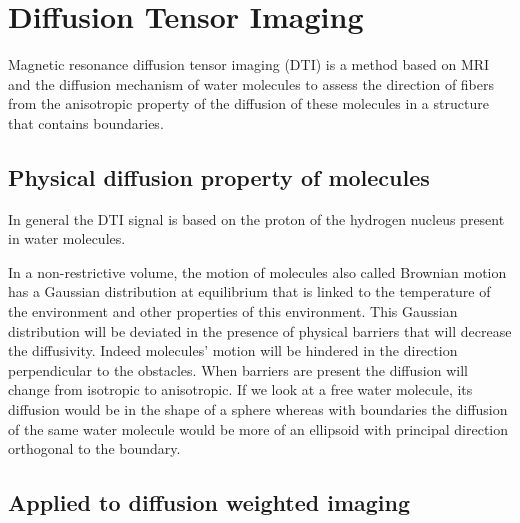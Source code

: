 \section{Diffusion Tensor Imaging}

Magnetic resonance diffusion tensor imaging (DTI) is a method based on MRI and the diffusion mechanism of water molecules to assess the direction of fibers from the anisotropic property of the diffusion of these molecules in a structure that contains boundaries.

\subsection{Physical diffusion property of molecules}

In general the DTI signal is based on the proton of the hydrogen nucleus present in water molecules.

In a non-restrictive volume, the motion of molecules also called Brownian motion has a Gaussian distribution at equilibrium that is linked to the temperature of the environment and other properties of this environment. This Gaussian distribution will be deviated in the presence of physical barriers that will decrease the diffusivity. Indeed molecules' motion will be hindered in the direction perpendicular to the obstacles. When barriers are present the diffusion will change from isotropic to anisotropic. If we look at a free water molecule, its diffusion would be in the shape of a sphere whereas with boundaries the diffusion of the same water molecule would be more of an ellipsoid with principal direction orthogonal to the boundary.

\subsection{Applied to diffusion weighted imaging} \label{dw_imaging}

